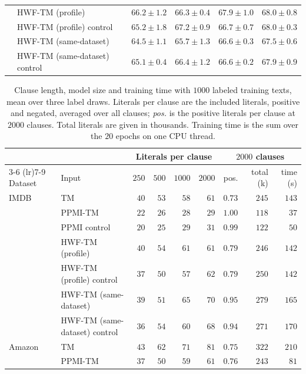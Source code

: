 \begin{table}[H]
\begin{tabular}{llcccc}
 & HWF-TM (profile) & $66.2 \pm 1.2$ & $66.3 \pm 0.4$ & $67.9 \pm 1.0$ & $68.0 \pm 0.8$ \\
 & HWF-TM (profile) control & $65.2 \pm 1.8$ & $67.2 \pm 0.9$ & $66.7 \pm 0.7$ & $68.0 \pm 0.3$ \\
 & HWF-TM (same-dataset) & $64.5 \pm 1.1$ & $65.7 \pm 1.3$ & $66.6 \pm 0.3$ & $67.5 \pm 0.6$ \\
 & HWF-TM (same-dataset) control & $65.1 \pm 0.4$ & $66.4 \pm 1.2$ & $66.6 \pm 0.2$ & $67.9 \pm 0.9$ \\
\bottomrule
\end{tabular}
\end{table}

\begin{table}[H]
\centering
\small
\setlength{\tabcolsep}{4pt}
\caption{Clause length, model size and training time with $1000$ labeled training texts, mean over
three label draws. Literals per clause are the included literals, positive and negated, averaged
over all clauses; \emph{pos.} is the positive literals per clause at $2000$ clauses. Total literals
are given in thousands. Training time is the sum over the $20$ epochs on one CPU thread.}
\label{tab:app-n1000-size}
\begin{tabular}{llrrrrrrr}
\toprule
 & & \multicolumn{4}{c}{Literals per clause} & \multicolumn{3}{c}{$2000$ clauses} \\
\cmidrule(lr){3-6} \cmidrule(lr){7-9}
Dataset & Input & $250$ & $500$ & $1000$ & $2000$ & pos. & total (k) & time (s) \\
\midrule
IMDB & TM & $40$ & $53$ & $58$ & $61$ & $0.73$ & $245$ & $143$ \\
 & PPMI-TM & $22$ & $26$ & $28$ & $29$ & $1.00$ & $118$ & $37$ \\
 & PPMI control & $20$ & $25$ & $29$ & $31$ & $0.99$ & $122$ & $50$ \\
 & HWF-TM (profile) & $40$ & $54$ & $61$ & $61$ & $0.79$ & $246$ & $142$ \\
 & HWF-TM (profile) control & $37$ & $50$ & $57$ & $62$ & $0.79$ & $250$ & $142$ \\
 & HWF-TM (same-dataset) & $39$ & $51$ & $65$ & $70$ & $0.95$ & $279$ & $165$ \\
 & HWF-TM (same-dataset) control & $36$ & $54$ & $60$ & $68$ & $0.94$ & $271$ & $170$ \\
\midrule
Amazon & TM & $43$ & $62$ & $71$ & $81$ & $0.75$ & $322$ & $210$ \\
 & PPMI-TM & $37$ & $50$ & $59$ & $61$ & $0.76$ & $243$ & $81$ \\

\end{tabular}
\end{table}
